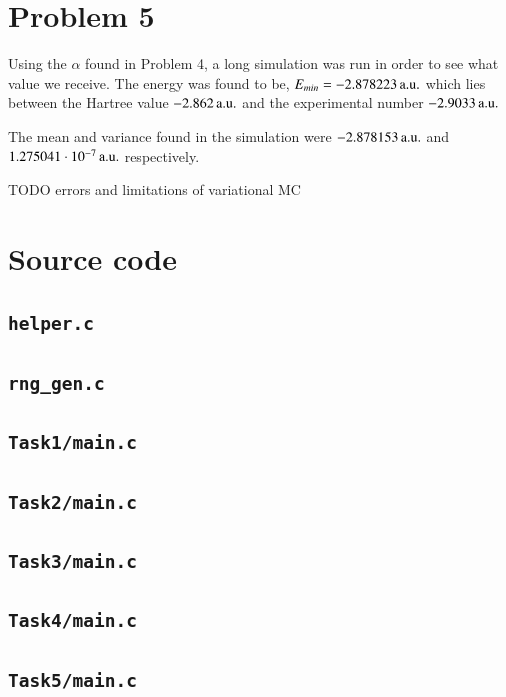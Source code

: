 \section*{Problem 5}

Using the $\alpha$ found in Problem 4, a long simulation was run in order to see what value we receive. The energy was found to be, $E_{min}=\unit[-2.878223]{a.u.}$ which lies between the Hartree value $\unit[-2.862]{a.u.}$ and the experimental number $\unit[-2.9033]{a.u.}$

The mean and variance found in the simulation were $\unit[-2.878153]{a.u.}$ and $\unit[1.275041 \cdot 10^{-7}]{a.u.}$ respectively.

TODO errors and limitations of variational MC






\appendix
\section{Source code}
\subsection{\texttt{helper.c}}


\subsection{\texttt{rng\_gen.c}}


\subsection{\texttt{Task1/main.c}}


\subsection{\texttt{Task2/main.c}}


\subsection{\texttt{Task3/main.c}}


\subsection{\texttt{Task4/main.c}}


\subsection{\texttt{Task5/main.c}}




